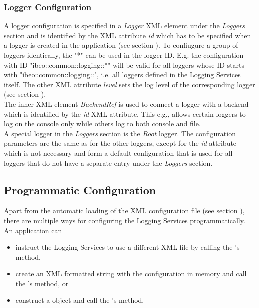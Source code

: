\subsubsection{Logger Configuration}
A logger configuration is specified in a \textit{Logger} XML element under the \textit{Loggers} section and is identified by the XML attribute \textit{id} which has to be specified when a logger is created in the application (see section ). To confiugure a group of loggers identically, the "*" can be used in the logger ID. E.g. the configuration with ID "ibeo::common::logging::*" will be valid for all loggers whose ID starts with "ibeo::common::logging::", i.e. all loggers defined in the Logging Services itself. The other XML attribute \textit{level} sets the log level of the corresponding logger (see section ).\\
The inner XML element \textit{BackendRef} is used to connect a logger with a backend which is identified by the \textit{id} XML attribute. This e.g., allows certain loggers to log on the console only while others log to both console and file.\\
A special logger in the \textit{Loggers} section is the \textit{Root} logger. The configuration parameters are the same as for the other loggers, except for the \textit{id} attribute which is not necessary and form a default configuration that is used for all loggers that do not have a separate entry under the \textit{Loggers} section.

\subsection{Programmatic Configuration}
Apart from the automatic loading of the XML configuration file (see section ), there are multiple ways for configuring the Logging Services programmatically. An application can
\begin{itemize}
	\item instruct the Logging Services to use a different XML file by calling the 's  method,
	\item create an XML formatted string with the configuration in memory and call the 's  method, or
	\item construct a  object and call the 's  method.
\end{itemize}

